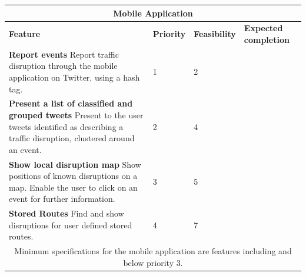 \begin{center}
\begin{tabular}{ | p{8.4cm} | p{1.8cm} | p{1.8cm} | p{2.2cm} | }
\hline
\multicolumn{4}{|c|}{\textbf{Mobile Application}} \\ \hline
\textbf{Feature} & \textbf{Priority} & \textbf{Feasibility} & \textbf{Expected completion} \\ \hline
\textbf{Report events}\newline
Report traffic disruption through the mobile application on Twitter, using a hash tag. & 1 & 2 & \\ \hline
\textbf{Present a list of classified and grouped tweets}\newline
Present to the user tweets identified as describing a traffic disruption,
clustered around an event. & 2 & 4 & \\ \hline
\textbf{Show local disruption map}\newline
Show positions of known disruptions on a map. Enable the user to click on an event for further information. & 3 & 5 & \\ \hline
\textbf{Stored Routes}\newline
Find and show disruptions for user defined stored routes. & 4 & 7 & \\ \hline
\multicolumn{4}{|c|}{Minimum specifications for the mobile application are
features including and below priority 3.} \\ \hline
\end{tabular}
\end{center}
